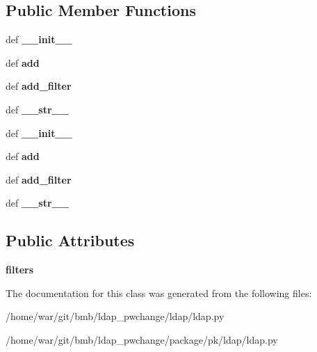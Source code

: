 \subsection*{Public Member Functions}
\begin{DoxyCompactItemize}
\item 
\hypertarget{classldap_1_1ldap_1_1LDAPFilter_a532a264a042d9a31f0a6752e6370c25a}{def {\bfseries \-\_\-\-\_\-init\-\_\-\-\_\-}}\label{classldap_1_1ldap_1_1LDAPFilter_a532a264a042d9a31f0a6752e6370c25a}

\item 
\hypertarget{classldap_1_1ldap_1_1LDAPFilter_a745849b29bb563fc12737948255f9151}{def {\bfseries add}}\label{classldap_1_1ldap_1_1LDAPFilter_a745849b29bb563fc12737948255f9151}

\item 
\hypertarget{classldap_1_1ldap_1_1LDAPFilter_a8001419530415812ae6f3bc2f3d87ad5}{def {\bfseries add\-\_\-filter}}\label{classldap_1_1ldap_1_1LDAPFilter_a8001419530415812ae6f3bc2f3d87ad5}

\item 
\hypertarget{classldap_1_1ldap_1_1LDAPFilter_a5ba26c6014c23a33892264bc6337db13}{def {\bfseries \-\_\-\-\_\-str\-\_\-\-\_\-}}\label{classldap_1_1ldap_1_1LDAPFilter_a5ba26c6014c23a33892264bc6337db13}

\item 
\hypertarget{classldap_1_1ldap_1_1LDAPFilter_a532a264a042d9a31f0a6752e6370c25a}{def {\bfseries \-\_\-\-\_\-init\-\_\-\-\_\-}}\label{classldap_1_1ldap_1_1LDAPFilter_a532a264a042d9a31f0a6752e6370c25a}

\item 
\hypertarget{classldap_1_1ldap_1_1LDAPFilter_a745849b29bb563fc12737948255f9151}{def {\bfseries add}}\label{classldap_1_1ldap_1_1LDAPFilter_a745849b29bb563fc12737948255f9151}

\item 
\hypertarget{classldap_1_1ldap_1_1LDAPFilter_a8001419530415812ae6f3bc2f3d87ad5}{def {\bfseries add\-\_\-filter}}\label{classldap_1_1ldap_1_1LDAPFilter_a8001419530415812ae6f3bc2f3d87ad5}

\item 
\hypertarget{classldap_1_1ldap_1_1LDAPFilter_a5ba26c6014c23a33892264bc6337db13}{def {\bfseries \-\_\-\-\_\-str\-\_\-\-\_\-}}\label{classldap_1_1ldap_1_1LDAPFilter_a5ba26c6014c23a33892264bc6337db13}

\end{DoxyCompactItemize}
\subsection*{Public Attributes}
\begin{DoxyCompactItemize}
\item 
\hypertarget{classldap_1_1ldap_1_1LDAPFilter_ad45678b172319ab01933a92f6ce44f3c}{{\bfseries filters}}\label{classldap_1_1ldap_1_1LDAPFilter_ad45678b172319ab01933a92f6ce44f3c}

\end{DoxyCompactItemize}


The documentation for this class was generated from the following files\-:\begin{DoxyCompactItemize}
\item 
/home/war/git/bmb/ldap\-\_\-pwchange/ldap/ldap.\-py\item 
/home/war/git/bmb/ldap\-\_\-pwchange/package/pk/ldap/ldap.\-py\end{DoxyCompactItemize}
